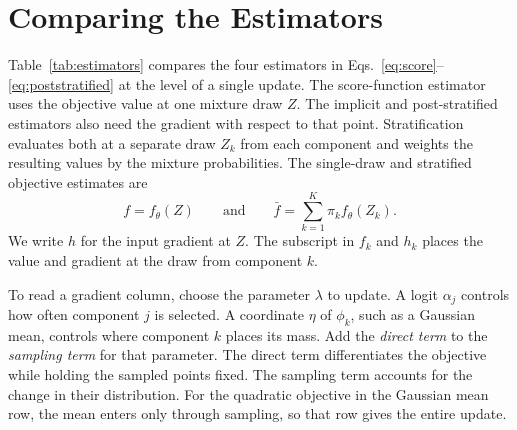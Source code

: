 \clearpage
\section{Comparing the Estimators}
\label{sec:comparison}
Table~\ref{tab:estimators} compares the four estimators in
Eqs.~\eqref{eq:score}--\eqref{eq:poststratified} at the level of a single
update. The score-function estimator
uses the objective value at one mixture draw $Z$. The implicit and
post-stratified estimators also need the gradient with respect to that point.
Stratification evaluates both at a separate draw $Z_k$ from each component
and weights the resulting values by the mixture probabilities.
The single-draw and stratified objective estimates are
\begin{equation*}
 f = f_\theta(Z)
 \qquad\text{and}\qquad
 \bar f = \sum_{k=1}^K \pi_k f_\theta(Z_k).
\end{equation*}
We write $h$ for the input gradient at $Z$. The subscript in $f_k$ and $h_k$
places the value and gradient at the draw from component $k$.

To read a gradient column, choose the parameter $\lambda$ to update.
A logit $\alpha_j$ controls how often component $j$ is selected. A coordinate
$\eta$ of $\phi_k$, such as a Gaussian mean, controls where component $k$
places its mass. Add the \emph{direct term} to the \emph{sampling term} for
that parameter. The direct term differentiates the objective while holding
the sampled points fixed. The sampling term accounts for the change in
their distribution.
For the quadratic objective in the Gaussian mean row, the mean enters only
through sampling, so that row gives the entire update.

